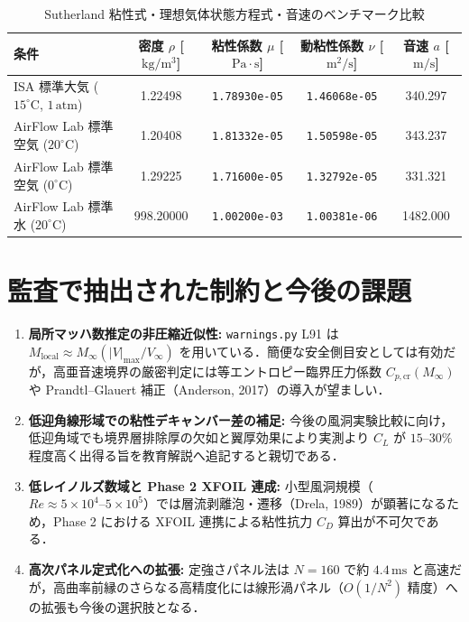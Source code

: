 \documentclass[10pt,a4paper]{article}
\begin{document}
\begin{table}[H]
  \centering
  \caption{Sutherland 粘性式・理想気体状態方程式・音速のベンチマーク比較}
  \label{tab:isa}
  \small
  \renewcommand{\arraystretch}{1.28}
  \setlength{\tabcolsep}{7.5pt}
  \begin{tabular}{@{}lcccc@{}}
    \toprule
    条件 & 密度 $\rho$ [$\mathrm{kg/m^3}$] & 粘性係数 $\mu$ [$\mathrm{Pa\cdot s}$] & 動粘性係数 $\nu$ [$\mathrm{m^2/s}$] & 音速 $a$ [$\mathrm{m/s}$] \\
    \midrule
    ISA 標準大気 ($15^\circ\mathrm{C}$, $1\,\mathrm{atm}$) & 1.22498 & \texttt{1.78930e-05} & \texttt{1.46068e-05} & 340.297 \\
    AirFlow Lab 標準空気 ($20^\circ\mathrm{C}$) & 1.20408 & \texttt{1.81332e-05} & \texttt{1.50598e-05} & 343.237 \\
    AirFlow Lab 標準空気 ($0^\circ\mathrm{C}$)  & 1.29225 & \texttt{1.71600e-05} & \texttt{1.32792e-05} & 331.321 \\
    AirFlow Lab 標準水 ($20^\circ\mathrm{C}$)   & 998.20000 & \texttt{1.00200e-03} & \texttt{1.00381e-06} & 1482.000 \\
    \bottomrule
  \end{tabular}
\end{table}

\section{監査で抽出された制約と今後の課題}

\begin{enumerate}\setlength{\itemsep}{3pt}\setlength{\parskip}{0pt}
  \item \textbf{局所マッハ数推定の非圧縮近似性:} \texttt{warnings.py} L91 は $M_{\mathrm{local}} \approx M_\infty (|V|_{\max}/V_\infty)$ を用いている．簡便な安全側目安としては有効だが，高亜音速境界の厳密判定には等エントロピー臨界圧力係数 $C_{p,\mathrm{cr}}(M_\infty)$ や Prandtl--Glauert 補正（Anderson, 2017）の導入が望ましい．
  \item \textbf{低迎角線形域での粘性デキャンバー差の補足:} 今後の風洞実験比較に向け，低迎角域でも境界層排除厚の欠如と翼厚効果により実測より $C_L$ が $15\text{--}30\%$ 程度高く出得る旨を教育解説へ追記すると親切である．
  \item \textbf{低レイノルズ数域と Phase 2 XFOIL 連成:} 小型風洞規模（$Re \approx 5\times 10^4\text{--}5\times 10^5$）では層流剥離泡・遷移（Drela, 1989）が顕著になるため，Phase 2 における XFOIL 連携による粘性抗力 $C_D$ 算出が不可欠である．
  \item \textbf{高次パネル定式化への拡張:} 定強さパネル法は $N=160$ で約 $4.4\,\mathrm{ms}$ と高速だが，高曲率前縁のさらなる高精度化には線形渦パネル（$O(1/N^2)$ 精度）への拡張も今後の選択肢となる．
\end{enumerate}
\end{document}
